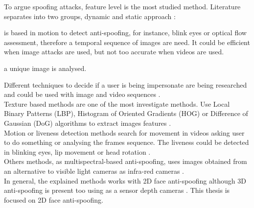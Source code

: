 To argue spoofing attacks, feature level is the most studied method. Literature separates into two groups, dynamic and static approach \cite{Spoofing_survey}:
\begin{description}[noitemsep,topsep=8pt,parsep=0pt,partopsep=20pt]
\item[Dynamic:] is based in motion to detect anti-spoofing, for instance, blink eyes or optical flow assessment, therefore a temporal sequence of images are need. It could be efficient when image attacks are used, but not too accurate when videos are used. 
\item[Static:] a unique image is analysed.
\end{description}

Different techniques to decide if a user is being impersonate are being researched and could be used with image and video sequences \cite{Spoofing_survey}.\\

Texture based methods are one of the most investigate methods. Use Local Binary Patterns (LBP),  Histogram of Oriented Gradients (HOG) or Difference of Gaussian (DoG) algorithms to extract images features \cite{distorsion,Spoofing_survey}.\\

Motion or liveness detection methods search for movement in videos asking user to do something or analysing the frames sequence. The liveness could be detected in blinking eyes, lip movement or head rotation \cite{distorsion,Spoofing_survey}.\\

Others methods, as multispectral-based anti-spoofing, uses images obtained from an alternative to visible light cameras as infra-red cameras \cite{distorsion}.\\

In general, the explained methods works with 2D face anti-spoofing although 3D anti-spoofing is present too using as a sensor depth cameras \cite{2d_3d_face}. This thesis is focused on 2D face anti-spoofing.\\